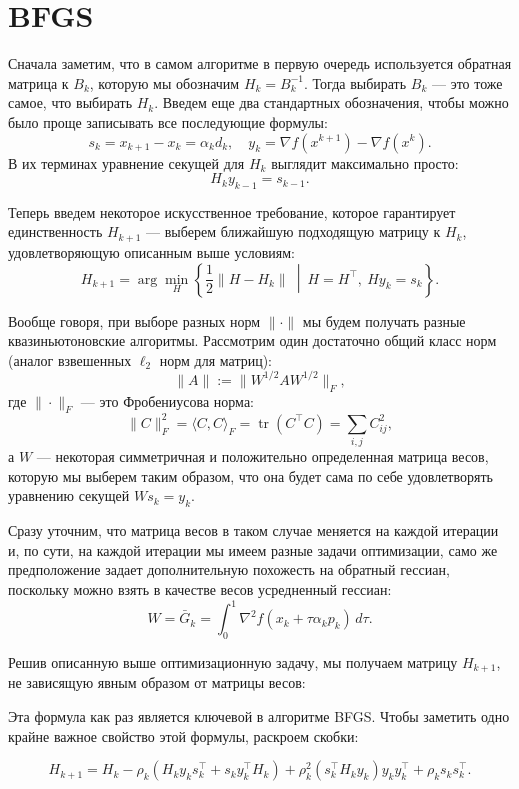 \section*{BFGS}

Сначала заметим, что в самом алгоритме в первую очередь используется обратная матрица к $B_k$, которую мы обозначим $H_k = B_k^{-1}$. Тогда выбирать $B_k$ — это тоже самое, что выбирать $H_k$. Введем еще два стандартных обозначения, чтобы можно было проще записывать все последующие формулы:
\[
    s_k = x_{k+1} - x_k = \alpha_k d_k, \quad y_k = \nabla f(x^{k+1}) - \nabla f(x^k).
\]
В их терминах уравнение секущей для $H_k$ выглядит максимально просто:
\[
    H_k y_{k-1} = s_{k-1}.
\]

Теперь введем некоторое искусственное требование, которое гарантирует единственность $H_{k+1}$ — выберем ближайшую подходящую матрицу к $H_k$, удовлетворяющую описанным выше условиям:
\[
    H_{k+1} = \arg\min_H \left\{ \frac{1}{2} \| H - H_k \| \ \middle| \ H = H^\top, \ H y_k = s_k \right\}.
\]

Вообще говоря, при выборе разных норм $\|\cdot\|$ мы будем получать разные квазиньютоновские алгоритмы. Рассмотрим один достаточно общий класс норм (аналог взвешенных $\ell_2$ норм для матриц):
\[
    \|A\| := \|W^{1/2} A W^{1/2}\|_F,
\]
где $\|\cdot\|_F$ — это Фробениусова норма:
\[
    \|C\|_F^2 = \langle C, C \rangle_F = \operatorname{tr}(C^\top C) = \sum_{i,j} C_{ij}^2,
\]
а $W$ — некоторая симметричная и положительно определенная матрица весов, которую мы выберем таким образом, что она будет сама по себе удовлетворять уравнению секущей $W s_k = y_k$.

Сразу уточним, что матрица весов в таком случае меняется на каждой итерации и, по сути, на каждой итерации мы имеем разные задачи оптимизации, само же предположение задает дополнительную похожесть на обратный гессиан, поскольку можно взять в качестве весов усредненный гессиан:
\[
    W = \bar{G}_k = \int_0^1 \nabla^2 f(x_k + \tau \alpha_k p_k) \, d\tau.
\]

Решив описанную выше оптимизационную задачу, мы получаем матрицу $H_{k+1}$, не зависящую явным образом от матрицы весов:

Эта формула как раз является ключевой в алгоритме BFGS. Чтобы заметить одно крайне важное свойство этой формулы, раскроем скобки:

\[
    H_{k+1} = H_k - \rho_k \left( H_k y_k s_k^\top + s_k y_k^\top H_k \right)
    + \rho_k^2 \left( s_k^\top H_k y_k \right) y_k y_k^\top + \rho_k s_k s_k^\top.
\]

